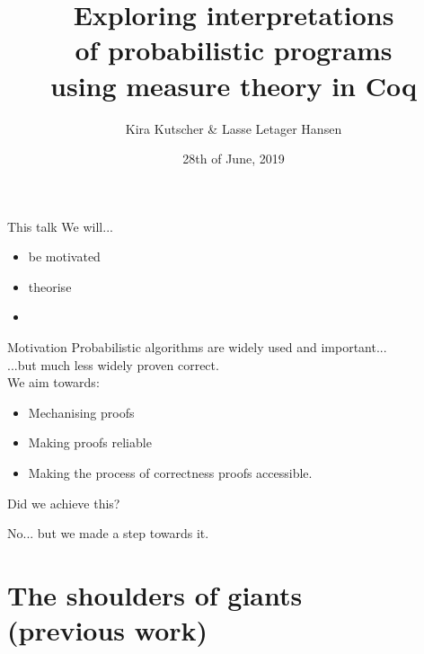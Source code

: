 \documentclass{beamer}
\title{Exploring interpretations \\ of probabilistic programs \\ using measure theory in Coq}
\author{Kira Kutscher \& Lasse Letager Hansen}
\date{28th of June, 2019}
\begin{document}
\newcommand\rml{$\mathcal{R}$\texttt{ml}} %
\maketitle


\begin{frame}{This talk}
  We will...
  \pause
  \begin{itemize}
      \item be motivated
    \pause
      \item theorise
    \pause
      \item 
  \end{itemize}
\end{frame}


\begin{frame}{Motivation}
  Probabilistic algorithms are widely used and important...\\
    \pause
    ...but much less widely proven correct.\\
    \bigskip
    \pause
    We aim towards:
    \pause
    \begin{itemize}
        \item Mechanising proofs
      \pause
        \item Making proofs reliable
      \pause
        \item Making the process of correctness proofs accessible. 
    \end{itemize}
    \pause
    \bigskip
    \medskip
    Did we achieve this?
    \pause
    \begin{flushright}
      No... but we made a step towards it. 
    \end{flushright}
\end{frame}


\section{The shoulders of giants \\ (previous work)}

\end{document}
